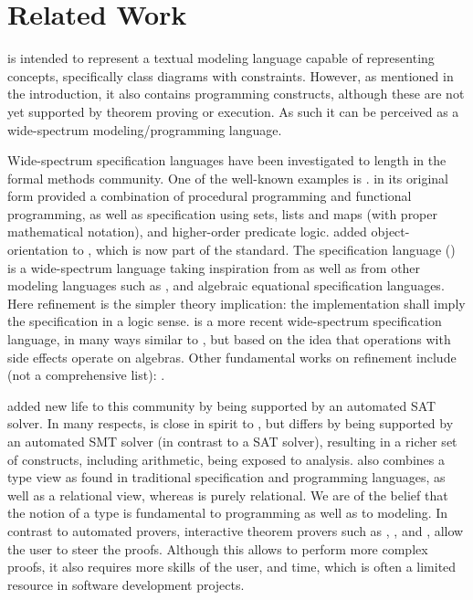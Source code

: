 
\section{Related Work}
\label{sec:related-work}

\Klang{} is intended to represent a textual modeling language capable
of representing \sysml{} concepts, specifically class diagrams with
constraints.  However, as mentioned in the introduction, it also
contains programming constructs, although these are not yet supported by theorem proving or execution.  As such it can be perceived as a
wide-spectrum modeling/programming language.

Wide-spectrum specification languages have been investigated to length
in the formal methods community. One of the well-known examples is
\vdm{} \cite{vdm78,bjoerner-jones-82,jones90,jones-shaw-90}. \vdm{} in
its original form \cite{vdm78} provided a combination of procedural
programming and functional programming, as well as specification using
sets, lists and maps (with proper mathematical notation), and
higher-order predicate logic. \vdmpp{} \cite{vdmplusplus05} added
object-orientation to \vdm{}, which is now part of the \vdm{}
standard. The \raiselang{} specification language (\rsl{})
\cite{raise92} is a wide-spectrum language taking inspiration from
\vdm{} as well as from other modeling languages such as \zlang{}
\cite{spivey-Z-1988}, and algebraic equational specification
languages. Here refinement is the simpler theory implication: the
implementation shall imply the specification in a logic sense. \asml{}
\cite{asml05} is a more recent wide-spectrum specification language,
in many ways similar to \vdm{}, but based on the idea
that operations with side effects operate on algebras.  Other fundamental works on
refinement include (not a comprehensive list):
\cite{wirth-refinement-71,hoare-sanders-refinement-86,morgan-refinement-94,woodcock-sanders-z-96,back-wright-refinement-98,abrial-eventb-10}.

\alloy{} \cite{jackson-alloy-12} added new life to this community by
being supported by an automated SAT solver. In many respects, \Klang{}
is close in spirit to \alloy{}, but differs by being supported by an
automated SMT solver (in contrast to a SAT solver), resulting in a
richer set of constructs, including arithmetic, being exposed to
analysis. \Klang{} also combines a type view as found in traditional
specification and programming languages, as well as a relational view,
whereas \alloy{} is purely relational. We are of the belief that the
notion of a type is fundamental to programming as well as to
modeling. In contrast to automated provers, interactive theorem
provers such as \pvs{} \cite{cade92-pvs,pvs-website}, \coq{}
\cite{coq-website}, and \isabelle{} \cite{isabelle-website}, allow the
user to steer the proofs.  Although this allows to perform more
complex proofs, it also requires more skills of the user, and time,
which is often a limited resource in software development projects.

